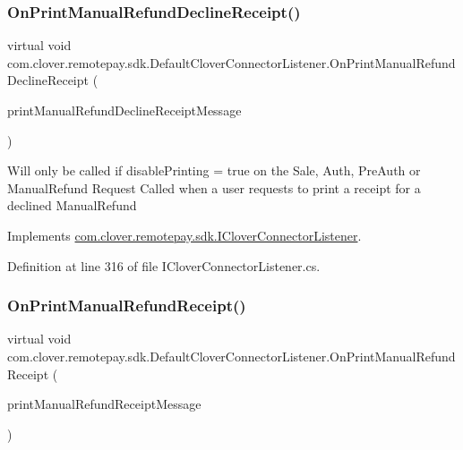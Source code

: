 \subsubsection{\texorpdfstring{On\+Print\+Manual\+Refund\+Decline\+Receipt()}{OnPrintManualRefundDeclineReceipt()}}
{\footnotesize\ttfamily virtual void com.\+clover.\+remotepay.\+sdk.\+Default\+Clover\+Connector\+Listener.\+On\+Print\+Manual\+Refund\+Decline\+Receipt (\begin{DoxyParamCaption}\item[{\hyperlink{classcom_1_1clover_1_1remotepay_1_1sdk_1_1_print_manual_refund_decline_receipt_message}{Print\+Manual\+Refund\+Decline\+Receipt\+Message}}]{print\+Manual\+Refund\+Decline\+Receipt\+Message }\end{DoxyParamCaption})\hspace{0.3cm}{\ttfamily [virtual]}}



Will only be called if disable\+Printing = true on the Sale, Auth, Pre\+Auth or Manual\+Refund Request Called when a user requests to print a receipt for a declined Manual\+Refund 



Implements \hyperlink{interfacecom_1_1clover_1_1remotepay_1_1sdk_1_1_i_clover_connector_listener_afb0b243842251d0fa8917d21b7b71246}{com.\+clover.\+remotepay.\+sdk.\+I\+Clover\+Connector\+Listener}.



Definition at line 316 of file I\+Clover\+Connector\+Listener.\+cs.

\mbox{\label{classcom_1_1clover_1_1remotepay_1_1sdk_1_1_default_clover_connector_listener_aed1c6c0e8dec09e3e724d752747d1b05}} 
\subsubsection{\texorpdfstring{On\+Print\+Manual\+Refund\+Receipt()}{OnPrintManualRefundReceipt()}}
{\footnotesize\ttfamily virtual void com.\+clover.\+remotepay.\+sdk.\+Default\+Clover\+Connector\+Listener.\+On\+Print\+Manual\+Refund\+Receipt (\begin{DoxyParamCaption}\item[{\hyperlink{classcom_1_1clover_1_1remotepay_1_1sdk_1_1_print_manual_refund_receipt_message}{Print\+Manual\+Refund\+Receipt\+Message}}]{print\+Manual\+Refund\+Receipt\+Message }\end{DoxyParamCaption})\hspace{0.3cm}{\ttfamily [virtual]}}



